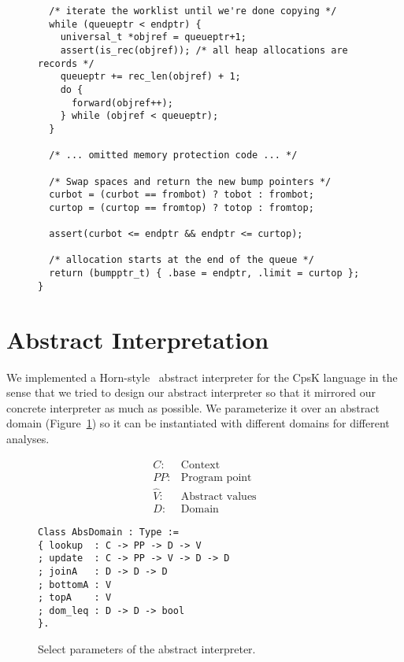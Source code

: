 \documentclass{article}
\begin{document}
\begin{figure}
\begin{lstlisting}
  /* iterate the worklist until we're done copying */
  while (queueptr < endptr) {
    universal_t *objref = queueptr+1;
    assert(is_rec(objref)); /* all heap allocations are records */
    queueptr += rec_len(objref) + 1;
    do {
      forward(objref++);
    } while (objref < queueptr);
  }

  /* ... omitted memory protection code ... */

  /* Swap spaces and return the new bump pointers */
  curbot = (curbot == frombot) ? tobot : frombot;
  curtop = (curtop == fromtop) ? totop : fromtop;

  assert(curbot <= endptr && endptr <= curtop);

  /* allocation starts at the end of the queue */
  return (bumpptr_t) { .base = endptr, .limit = curtop };
}
\end{lstlisting}
\end{figure}

\section{Abstract Interpretation}
\label{sec:abstract-interp}

We implemented a Horn-style~\cite{van2010abstracting} abstract interpreter for the CpsK language in the sense that we tried to design our abstract interpreter so that it mirrored our concrete interpreter as much as possible. We parameterize it over an abstract domain (Figure~\ref{fig:absinterp}) so it can be instantiated with different domains for different analyses. 

\begin{figure}
\centering
\begin{minipage}[t]{.2\textwidth}
\begin{align*}
C: & \text{Context} \\
PP: & \text{Program point} \\
\hat{V}: & \text{Abstract values} \\
D: & \text{Domain}
\end{align*}
\end{minipage}
\hspace{20pt}
\begin{minipage}[t]{.43\textwidth}
\begin{lstlisting}
Class AbsDomain : Type :=
{ lookup  : C -> PP -> D -> V
; update  : C -> PP -> V -> D -> D
; joinA   : D -> D -> D
; bottomA : V 
; topA    : V 
; dom_leq : D -> D -> bool
}.
\end{lstlisting}
\end{minipage}
\caption{Select parameters of the abstract interpreter.}
\label{fig:absinterp}
\end{figure}
\end{document}
